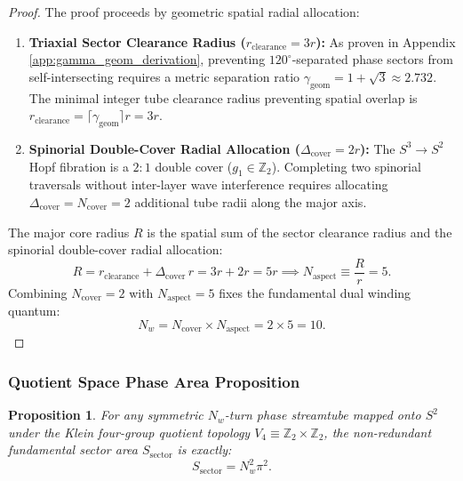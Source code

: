 \documentclass[11pt,a4paper]{article}
\newtheorem{prop}{Proposition}
\begin{document}
	\begin{proof}
		The proof proceeds by geometric spatial radial allocation:
		\begin{enumerate}
			\item \textbf{Triaxial Sector Clearance Radius ($r_{\text{clearance}} = 3r$):} As proven in Appendix \ref{app:gamma_geom_derivation}, preventing $120^\circ$-separated phase sectors from self-intersecting requires a metric separation ratio $\gamma_{\text{geom}} = 1 + \sqrt{3} \approx 2.732$. The minimal integer tube clearance radius preventing spatial overlap is $r_{\text{clearance}} = \lceil \gamma_{\text{geom}} \rceil r = 3r$.
			\item \textbf{Spinorial Double-Cover Radial Allocation ($\Delta_{\text{cover}} = 2r$):} The $S^3 \to S^2$ Hopf fibration is a $2:1$ double cover ($g_1 \in \mathbb{Z}_2$). Completing two spinorial traversals without inter-layer wave interference requires allocating $\Delta_{\text{cover}} = N_{\text{cover}} = 2$ additional tube radii along the major axis.
		\end{enumerate}
		The major core radius $R$ is the spatial sum of the sector clearance radius and the spinorial double-cover radial allocation:
		\begin{equation}
			R = r_{\text{clearance}} + \Delta_{\text{cover}} \, r = 3r + 2r = 5r \implies N_{\text{aspect}} \equiv \frac{R}{r} = 5.
			\label{eq:N_aspect_radial_proof}
		\end{equation}
		Combining $N_{\text{cover}} = 2$ with $N_{\text{aspect}} = 5$ fixes the fundamental dual winding quantum:
		\begin{equation}
			N_w = N_{\text{cover}} \times N_{\text{aspect}} = 2 \times 5 = 10.
			\label{eq:Nw_topological_derivation}
		\end{equation}
	\end{proof}
	
	\subsubsection{Quotient Space Phase Area Proposition}
	\begin{prop}
		For any symmetric $N_w$-turn phase streamtube mapped onto $S^2$ under the Klein four-group quotient topology $V_4 \equiv \mathbb{Z}_2 \times \mathbb{Z}_2$, the non-redundant fundamental sector area $S_{\text{sector}}$ is exactly:
		\begin{equation}
			S_{\text{sector}} = N_w^2 \pi^2.
			\label{eq:prop_sector_area}
		\end{equation}
	\end{prop}
	
\end{document}
